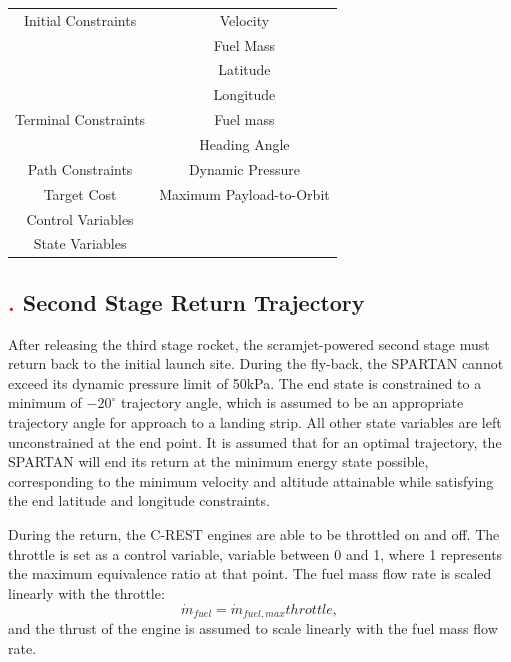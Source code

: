 \begin{table}[H]
\begin{tabular}{|c|c|}
	\hline Initial Constraints  & Velocity \\ & Fuel Mass  \\ & Latitude \\ & Longitude \\ 
	\hline Terminal Constraints & Fuel mass \\ & Heading Angle \\ 
	\hline Path Constraints & Dynamic Pressure \\ 
	\hline Target Cost & Maximum Payload-to-Orbit \\ 
			\hline Control Variables &  \\ 
			\hline State Variables &  \\ 
	\hline 
\end{tabular} 

\end{table}

\subsection{\textcolor{red}{.} Second Stage Return Trajectory}
After releasing the third stage rocket, the scramjet-powered second stage must return back to the initial launch site.
During the fly-back, the SPARTAN cannot exceed its dynamic pressure limit of 50kPa. 
 The end state is constrained to a minimum of $-20^\circ$ trajectory angle, which is assumed to be an appropriate trajectory angle for approach to a landing strip. All other state variables are left unconstrained at the end point. It is assumed that for an optimal trajectory, the SPARTAN will end its return at the minimum energy state possible, corresponding to the minimum velocity and altitude attainable while satisfying the end latitude and longitude constraints. 
 
During the return, the C-REST engines are able to be throttled on and off. The throttle is set as a control variable, variable between 0 and 1, where 1 represents the maximum equivalence ratio at that point. The fuel mass flow rate is scaled linearly with the throttle:  
\begin{equation}
\dot{m}_{fuel} = \dot{m}_{fuel,max}throttle,
\end{equation}
and the thrust of the engine is assumed to scale linearly with the fuel mass flow rate. 

